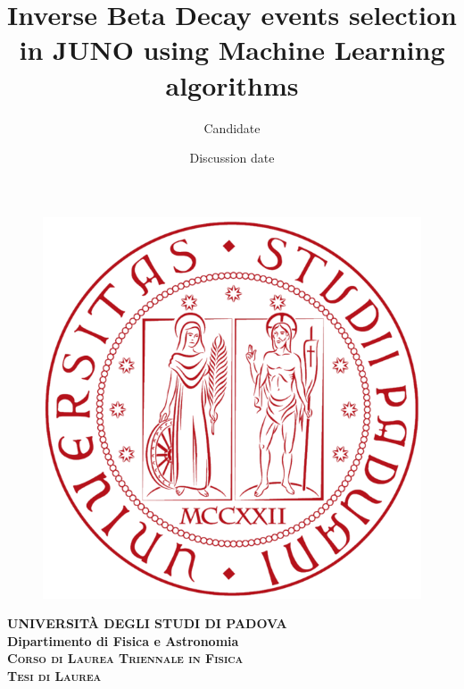 \documentclass[a4paper,12pt]{memoir} %
\title{Inverse Beta Decay events selection in JUNO using Machine Learning algorithms}
\author{Candidate}
\date{Discussion date}
\begin{document}
  \frontmatter
  \begin{titlingpage} %
    \vspace{5mm}
    \begin{figure}[ht]
      \centering
      \includegraphics[scale=.13]{Images/logo.png}
    \end{figure}
    \vspace{5mm}
    \begin{center}
      {{\Large{\textsc{\textbf{UNIVERSITÀ DEGLI STUDI DI PADOVA}}}}\\}
      \vspace{5mm}
      {\textbf{Dipartimento di Fisica e Astronomia}} \\ %
      \vspace{5mm}
      {\textsc{\textbf{Corso di Laurea Triennale in Fisica}}}\\ %
      \vspace{20mm}
      {\textsc{\textbf{Tesi di Laurea}}}\\ %
      \vspace{25mm}
      \begin{Spacing}{3}
        {\Large \textbf{\thetitle}}\\
      \end{Spacing}
      \vspace{8mm}
    \end{center}


\end{titlingpage}
\end{document}

